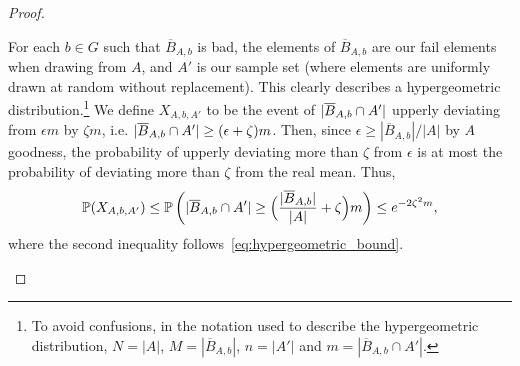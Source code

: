\begin{lemma}
\begin{proof}
\begin{enumerate}[label={\Roman*}., ref={\Roman*}, font=\rmfamily]
                    For each $b\in G$ such that $\overline{B}_{A,b}$ is bad,
                    the elements of $\overline{B}_{A,b}$ are our fail elements when drawing from $A$, and
                    $A'$ is our sample set (where elements are uniformly drawn at random without replacement).
                    This clearly describes a hypergeometric distribution.\footnote{
                        To avoid confusions, in the notation used to describe the hypergeometric distribution,
                        $N = |A|$, $M = |\overline{B}_{A,b}|$, $n = |A'|$ and $m = |\overline{B}_{A,b} \cap A'|$.}
                    We define $X_{A,b,A'}$ to be the event of $| \overline{B}_{A,b} \cap A' |$ upperly
                    deviating from $\epsilon m$ by $\zeta m$, i.e.
                    $| \overline{B}_{A,b} \cap A' | \geq (\epsilon + \zeta)m$.
                    Then, since $\epsilon \geq |\overline{B}_{A,b}|/|A|$ by $A$ goodness, the probability of upperly
                    deviating more than $\zeta$ from $\epsilon$ is at most the probability of deviating more than $\zeta$ from
                    the real mean.
                    Thus,
                    \[
                        \mathbb{P}( X_{A,b,A'} ) \leq \mathbb{P}\left( | \overline{B}_{A,b} \cap A' | \geq
                            \Bigl( \frac{|\overline{B}_{A,b}|}{|A|} + \zeta \Bigr) m \right) \leq e^{-2\zeta^2 m},
                    \]
                    where the second inequality follows~\eqref{eq:hypergeometric_bound}.


\end{enumerate}
\end{proof}
\end{lemma}

